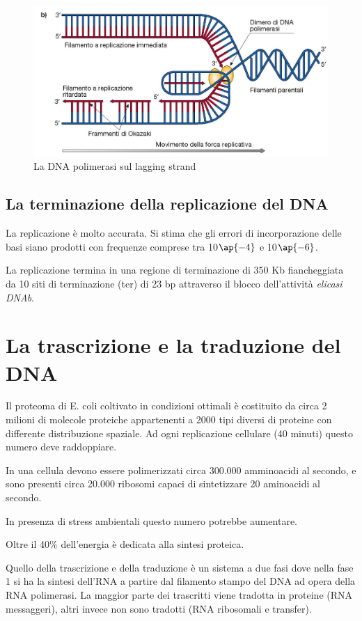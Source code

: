 \documentclass[11pt]{book}
\begin{document}
\begin{figure}[htp]
\centering
\includegraphics[scale=0.2]{img/Lagging strand.png}
\caption{La DNA polimerasi sul lagging strand}
\label{}
\end{figure}

\subsection{La terminazione della replicazione del DNA}
La replicazione è molto accurata. Si stima che gli errori di incorporazione delle basi siano prodotti con frequenze comprese tra 10$\ap{-4}$ e 10$\ap{-6}$.
 
La replicazione termina in una regione di terminazione di 350 Kb fiancheggiata da 10 siti di terminazione (ter) di 23 bp attraverso il blocco dell’attività \emph{elicasi DNAb}.

\clearpage
\section{La trascrizione e la traduzione del DNA}
Il proteoma di E. coli coltivato in condizioni ottimali è costituito da circa 2 milioni di molecole proteiche appartenenti a 2000 tipi diversi di proteine con differente distribuzione spaziale. Ad ogni replicazione cellulare (40 minuti) questo numero deve raddoppiare.

In una cellula devono essere polimerizzati circa 300.000 amminoacidi al secondo, e sono presenti circa 20.000 ribosomi capaci di sintetizzare 20 aminoacidi al secondo.

In presenza di stress ambientali questo numero potrebbe aumentare.

Oltre il 40$\%$ dell’energia è dedicata alla sintesi proteica.

Quello della trascrizione e della traduzione è un sistema a due fasi dove nella fase 1 si ha la sintesi dell'RNA a partire dal filamento stampo del DNA ad opera della RNA polimerasi. La maggior parte dei trascritti viene tradotta in proteine (RNA messaggeri), altri invece non sono tradotti (RNA ribosomali e transfer).
\end{document}
